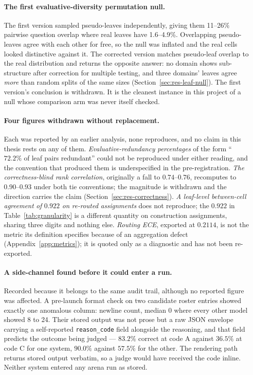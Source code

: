 \paragraph{The first evaluative-diversity permutation null.} The first version
sampled pseudo-leaves independently, giving them 11--26\% pairwise question
overlap where real leaves have 1.6--4.9\%. Overlapping pseudo-leaves agree with
each other for free, so the null was inflated and the real cells looked
distinctive against it. The corrected version matches pseudo-leaf overlap to the
real distribution and returns the opposite answer: no domain shows sub-structure
after correction for multiple testing, and three domains' leaves agree
\emph{more} than random splits of the same sizes
(Section~\ref{sec:res-leaf-null}). The first version's conclusion is withdrawn.
It is the cleanest instance in this project of a null whose comparison arm was
never itself checked.

\paragraph{Four figures withdrawn without replacement.} Each was reported by an
earlier analysis, none reproduces, and no claim in this thesis rests on any of
them. \emph{Evaluative-redundancy percentages} of the form ``$72.2\%$ of leaf
pairs redundant'' could not be reproduced under either reading, and the
convention that produced them is underspecified in the pre-registration.
\emph{The correctness-blind rank correlation}, originally a fall to
$0.74$--$0.76$, recomputes to $0.90$--$0.93$ under both tie conventions; the
magnitude is withdrawn and the direction carries the claim
(Section~\ref{sec:res-correctness}). \emph{A leaf-level between-cell agreement
of $0.922$ on re-routed assignments} does not reproduce; the $0.922$ in
Table~\ref{tab:granularity} is a different quantity on construction
assignments, sharing three digits and nothing else. \emph{Routing ECE},
exported at $0.2114$, is not the metric its definition specifies because of an
aggregation defect (Appendix~\ref{app:metrics}); it is quoted only as a
diagnostic and has not been re-exported.

\paragraph{A side-channel found before it could enter a run.} Recorded because
it belongs to the same audit trail, although no reported figure was affected. A
pre-launch format check on two candidate roster entries showed exactly one
anomalous column: newline count, median $0$ where every other model showed 8 to
24. Their stored output was not prose but a raw JSON envelope carrying a
self-reported \texttt{reason\_code} field alongside the reasoning, and that
field predicts the outcome being judged --- $83.2\%$ correct at code A against
$36.5\%$ at code C for one system, $90.0\%$ against $57.5\%$ for the other. The
rendering path returns stored output verbatim, so a judge would have received
the code inline. Neither system entered any arena run as stored.

